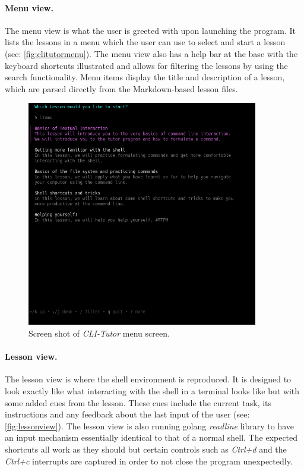 \paragraph{Menu view.} The menu view is what the user is greeted with upon
launching the program. It lists the lessons in a menu which the user can use to
select and start a lesson (see: \autoref{fig:clitutormenu}). The menu view also
has a help bar at the base with the keyboard shortcuts illustrated and allows
for filtering the lessons by using the search functionality. Menu items display
the title and description of a lesson, which are parsed directly from the
Markdown-based lesson files.

\begin{figure}[htbp]
	\centering
	\includegraphics[width=0.9\textwidth]{img/menushort}
	\caption{Screen shot of \textit{CLI-Tutor} menu screen.}
	\label{fig:clitutormenu}
\end{figure}


\paragraph{Lesson view.} The lesson view is where the shell environment is
reproduced. It is designed to look exactly like what interacting with the shell
in a terminal looks like but with some added cues from the lesson. These cues
include the current task, its instructions and any feedback about the
last input of the user (see: \autoref{fig:lessonview}). The lesson view is also
running golang \textit{readline} library to have an input mechanism essentially
identical to that of a normal shell. The expected shortcuts all work as they
should but certain controls such as \textit{Ctrl+d} and the  \textit{Ctrl+c}
interrupts are captured in order to not close the program unexpectedly.


